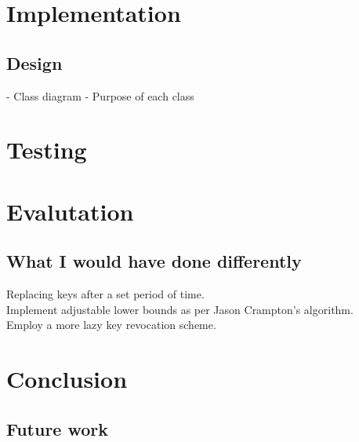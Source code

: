 \documentclass[12pt, titlepage]{article}
\begin{document}
\section{Implementation}
\subsection{Design}
- Class diagram
- Purpose of each class


\section{Testing}




\section{Evalutation}
\subsection{What I would have done differently}
Replacing keys after a set period of time.
\\ Implement adjustable lower bounds as per Jason Crampton's algorithm.
\\ Employ a more lazy key revocation scheme.

\section{Conclusion}
\subsection{Future work}
\end{document}
